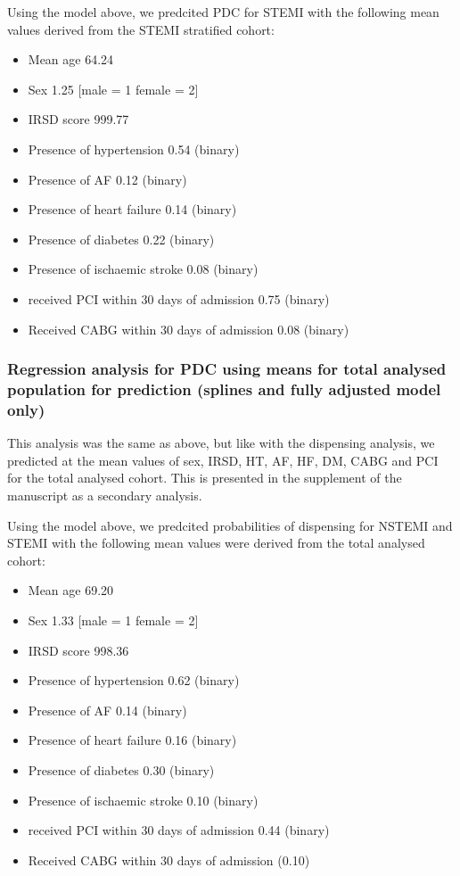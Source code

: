\documentclass[11pt]{article}
\begin{document}
Using the model above, we predcited PDC for STEMI with the following mean values derived from the STEMI stratified cohort: \\
\begin{itemize}
\item Mean age 64.24
\item Sex 1.25 [male = 1 female = 2]
\item IRSD score 999.77
\item Presence of hypertension 0.54 (binary)
\item Presence of AF 0.12 (binary)
\item Presence of heart failure 0.14 (binary)
\item Presence of diabetes 0.22 (binary)
\item Presence of ischaemic stroke 0.08 (binary)
\item received PCI within 30 days of admission 0.75 (binary)
\item Received CABG within 30 days of admission 0.08 (binary)
\end{itemize}
\color{violet}
\begin{stlog}\end{stlog}
\color{black}
\subsubsection{Regression analysis for PDC using means for total analysed population for prediction (splines and fully adjusted model only)}
This analysis was the same as above, but like with the dispensing analysis, we predicted at the mean values of sex, IRSD, HT, AF, HF, DM, CABG and PCI for the total analysed cohort. This is presented in the supplement of the manuscript as a secondary analysis. 
\color{violet}
\begin{stlog}\end{stlog}
\color{black}
Using the model above, we predcited probabilities of dispensing for NSTEMI and STEMI with the following mean values were derived from the total analysed cohort: \\
\begin{itemize}
\item Mean age 69.20
\item Sex 1.33 [male = 1 female = 2]
\item IRSD score 998.36
\item Presence of hypertension 0.62 (binary)
\item Presence of AF 0.14 (binary)
\item Presence of heart failure 0.16 (binary)
\item Presence of diabetes 0.30 (binary)
\item Presence of ischaemic stroke 0.10 (binary)
\item received PCI within 30 days of admission 0.44 (binary)
\item Received CABG within 30 days of admission (0.10)
\end{itemize}
\color{violet}
\begin{stlog}\end{stlog}
\clearpage
\color{black}

\end{document}
